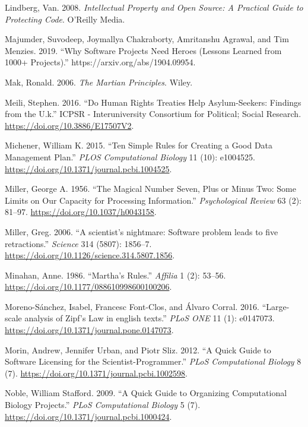 \documentclass[
]{krantz}
\newlength{\cslhangindent}
\newenvironment{cslreferences}%
  {\setlength{\parindent}{0pt}%
  \everypar{\setlength{\hangindent}{\cslhangindent}}\ignorespaces}%
  {\par}
\begin{document}
\begin{cslreferences}
\leavevmode\hypertarget{ref-Lind2008}{}%
Lindberg, Van. 2008. \emph{Intellectual Property and Open Source: A Practical Guide to Protecting Code}. O'Reilly Media.

\leavevmode\hypertarget{ref-Maju2019}{}%
Majumder, Suvodeep, Joymallya Chakraborty, Amritanshu Agrawal, and Tim Menzies. 2019. ``Why Software Projects Need Heroes (Lessons Learned from 1000+ Projects).'' https://arxiv.org/abs/1904.09954.

\leavevmode\hypertarget{ref-Mak2006}{}%
Mak, Ronald. 2006. \emph{The Martian Principles}. Wiley.

\leavevmode\hypertarget{ref-Meil2015}{}%
Meili, Stephen. 2016. ``Do Human Rights Treaties Help Asylum-Seekers: Findings from the U.k.'' ICPSR - Interuniversity Consortium for Political; Social Research. \url{https://doi.org/10.3886/E17507V2}.

\leavevmode\hypertarget{ref-Mich2015}{}%
Michener, William K. 2015. ``Ten Simple Rules for Creating a Good Data Management Plan.'' \emph{PLOS Computational Biology} 11 (10): e1004525. \url{https://doi.org/10.1371/journal.pcbi.1004525}.

\leavevmode\hypertarget{ref-Mill1956}{}%
Miller, George A. 1956. ``The Magical Number Seven, Plus or Minus Two: Some Limits on Our Capacity for Processing Information.'' \emph{Psychological Review} 63 (2): 81--97. \url{https://doi.org/10.1037/h0043158}.

\leavevmode\hypertarget{ref-Miller2006}{}%
Miller, Greg. 2006. ``A scientist's nightmare: Software problem leads to five retractions.'' \emph{Science} 314 (5807): 1856--7. \url{https://doi.org/10.1126/science.314.5807.1856}.

\leavevmode\hypertarget{ref-Mina1986}{}%
Minahan, Anne. 1986. ``Martha's Rules.'' \emph{Affilia} 1 (2): 53--56. \url{https://doi.org/10.1177/088610998600100206}.

\leavevmode\hypertarget{ref-Moreno2016}{}%
Moreno-Sánchez, Isabel, Francesc Font-Clos, and Álvaro Corral. 2016. ``Large-scale analysis of Zipf's Law in english texts.'' \emph{PLoS ONE} 11 (1): e0147073. \url{https://doi.org/10.1371/journal.pone.0147073}.

\leavevmode\hypertarget{ref-Mori2012}{}%
Morin, Andrew, Jennifer Urban, and Piotr Sliz. 2012. ``A Quick Guide to Software Licensing for the Scientist-Programmer.'' \emph{PLoS Computational Biology} 8 (7). \url{https://doi.org/10.1371/journal.pcbi.1002598}.

\leavevmode\hypertarget{ref-Nobl2009}{}%
Noble, William Stafford. 2009. ``A Quick Guide to Organizing Computational Biology Projects.'' \emph{PLoS Computational Biology} 5 (7). \url{https://doi.org/10.1371/journal.pcbi.1000424}.


\end{cslreferences}
\end{document}
